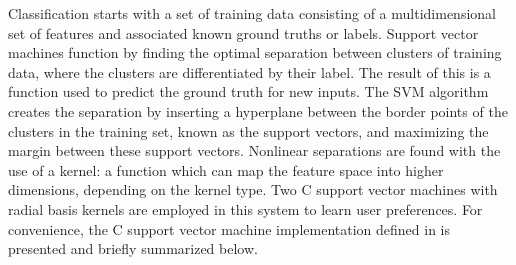 Classification starts with a set of training data consisting of a multidimensional set of features and associated known ground truths or labels. Support vector machines function by finding the optimal separation between clusters of training data, where the clusters are differentiated by their label. The result of this is a function used to predict the ground truth for new inputs. The SVM algorithm creates the separation by inserting a hyperplane between the border points of the clusters in the training set, known as the support vectors, and maximizing the margin between these support vectors. Nonlinear separations are found with the use of a kernel: a function which can map the feature space into higher dimensions, depending on the kernel type. Two C support vector machines with radial basis kernels are employed in this system to learn user preferences. For convenience, the C support vector machine implementation defined in \cite{LibSVM} is presented and briefly summarized below. 

